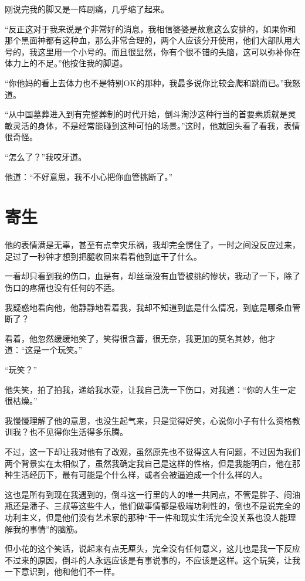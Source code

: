 刚说完我的脚又是一阵剧痛，几乎缩了起来。

“反正这对于我来说是个非常好的消息，我相信婆婆是故意这么安排的，如果你和那个黑面神都有这种血，那么非常合理的，两个人应该分开使用，他们大部队用大号的，我这里用一个小号的。而且很显然，你有个很不错的头脑，这可以弥补你在体力上的不足。”他按住我的脚道。

“你他妈的看上去体力也不是特别OK的那种，我最多说你比较会爬和跳而已。”我怒道。

“从中国墓葬进入到有完整葬制的时代开始，倒斗淘沙这种行当的首要素质就是灵敏灵活的身体，不是经常能碰到这种可怕的场景。”这时，他就回头看了看我，表情很奇怪。

“怎么了？”我咬牙道。

他道：“不好意思，我不小心把你血管挑断了。”

\chapter{寄生}

他的表情满是无辜，甚至有点幸灾乐祸，我却完全愣住了，一时之间没反应过来，足过了一秒钟才想到把腿收回来看看他到底干了什么。

一看却只看到我的伤口，血是有，却丝毫没有血管被挑的惨状，我动了一下，除了伤口的疼痛也没有任何的不适。

我疑惑地看向他，他静静地看着我，我却不知道到底是什么情况，到底是哪条血管断了？

看着，他忽然缓缓地笑了，笑得很含蓄，很无奈，我更加的莫名其妙，他才道：“这是一个玩笑。”

“玩笑？”

他失笑，拍了拍我，递给我水壶，让我自己洗一下伤口，对我道：“你的人生一定很枯燥。”

我慢慢理解了他的意思，也没生起气来，只是觉得好笑，心说你小子有什么资格教训我？也不见得你生活得多乐腾。

不过，这一下却让我对他有了改观，虽然原先也不觉得这人有问题，不过因为我们两个背景实在太相似了，虽然我确定我自己是这样的性格，但是我能明白，他在那种生活经历下，最有可能是个什么样，或者会被逼迫成一个什么样的人。

这也是所有到现在我遇到的，倒斗这一行里的人的唯一共同点，不管是胖子、闷油瓶还是潘子、三叔等这些牛人，他们做事情都是极端功利性的，倒也不是说完全的功利主义，但是他们没有艺术家的那种“干一件和现实生活完全没关系也没人能理解我的事情”的脑筋。

但小花的这个笑话，说起来有点无厘头，完全没有任何意义，这儿也是我一下反应不过来的原因，倒斗的人永远应该是有事说事的，不应该是这样。这个玩笑，让我一下意识到，他和他们不一样。

